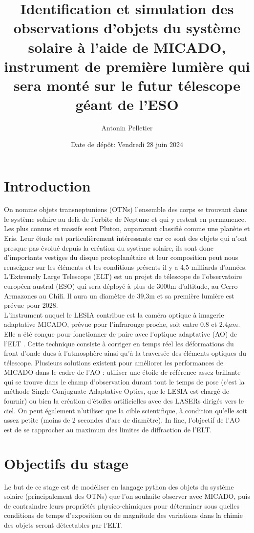 \documentclass[11pt]{aa}
\title{Identification et simulation des observations d'objets du système solaire à l'aide de MICADO, instrument de première lumière qui sera monté sur le futur télescope géant de l'ESO}
\author{Antonin Pelletier
          }
\institute{L3 Magistère de Physique, Université Paris-Cité, France\\
         \email{antonin.pelletier@etu.u-paris.fr}
         }
\date{Date de dépôt: Vendredi 28 juin 2024}
\begin{document}
 

\maketitle

\section{Introduction}
On nomme objets transneptuniens (OTNs) l'ensemble des corps se trouvant dans le système solaire au delà de l'orbite de Neptune et qui y restent en permanence. Les plus connus et massifs sont Pluton, auparavant classifié comme une planète et Eris. Leur étude est particulièrement intéressante car ce sont des objets qui n'ont presque pas évolué depuis la création du système solaire, ils sont donc d'importants vestiges du disque protoplanétaire et leur composition peut nous renseigner sur les éléments et les conditions présents il y a 4,5 milliards d'années.\\
L'Extremely Large Telescope (ELT) est un projet de télescope de l'observatoire européen austral (ESO) qui sera déployé à plus de 3000m d'altitude, au Cerro Armazones au Chili. Il aura un diamètre de 39,3m et sa première lumière est prévue pour 2028.\\ L'instrument auquel le LESIA contribue est la caméra optique à imagerie adaptative MICADO, prévue pour l'infrarouge proche, soit entre $0.8$ et $2.4\mu m$. Elle a été conçue pour fonctionner de paire avec l'optique adaptative (AO) de l'ELT \citep{ref_technique_MICADO}. Cette technique consiste à corriger en temps réel les déformations du front d'onde dues à l'atmosphère ainsi qu'à la traversée des éléments optiques du télescope. Plusieurs solutions existent pour améliorer les performances de MICADO dans le cadre de l'AO : utiliser une étoile de référence assez brillante qui se trouve dans le champ d'observation durant tout le temps de pose (c'est la méthode Single Conjuguate Adaptative Optics, que le LESIA est chargé de fournir) ou bien la création d'étoiles artificielles avec des LASERs dirigés vers le ciel. On peut également n'utiliser que la cible scientifique, à condition qu'elle soit assez petite (moins de 2 secondes d'arc de diamètre). In fine, l'objectif de l'AO est de se rapprocher au maximum des limites de diffraction de l'ELT.
\section{Objectifs du stage}
Le but de ce stage est de modéliser en langage python des objets du système solaire (principalement des OTNs) que l'on souhaite observer avec MICADO, puis de contraindre leurs propriétés physico-chimiques pour déterminer sous quelles conditions de temps d'exposition ou de magnitude des variations dans la chimie des objets seront détectables par l'ELT.
\end{document}
